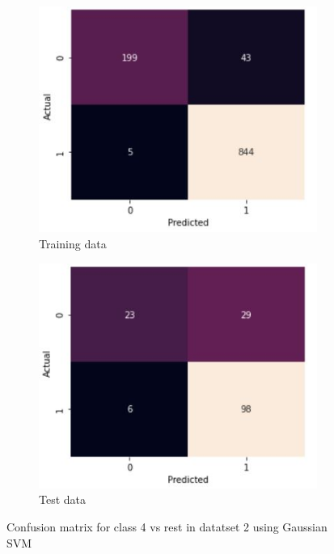 \documentclass[11pt]{article}
\begin{document}
\begin{figure}[h]
\centering
	\begin{subfigure}[b]{0.45\textwidth}
	\centering
	\includegraphics[scale=0.5]{dataset2_gauss_4_cm_train.jpg}
	\caption{Training data}
	\label{fig:fig3.2.5.1}
	\end{subfigure}
	\begin{subfigure}[b]{0.45\textwidth}
	\centering
	\includegraphics[scale=0.5]{dataset2_gauss_4_cm_test.jpg}
	\caption{Test data}
	\label{fig:fig3.2.5.2}
	\end{subfigure}
\caption{Confusion matrix for class 4 vs rest in datatset 2 using Gaussian SVM}
\label{fig:fig3.2.5}
\end{figure}
\end{document}
